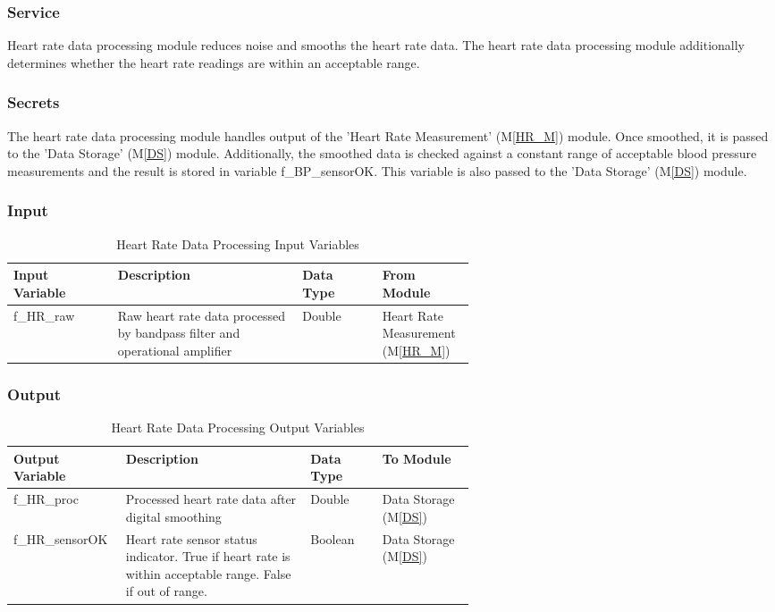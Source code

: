 \documentclass{article}
\begin{document}
\begin{description}
        \subsubsection{Service}
        Heart rate data processing module reduces noise and smooths the heart rate data.  The heart rate data processing module additionally determines whether the heart rate readings are within an acceptable range.
        
        \subsubsection{Secrets}
        The heart rate data processing module handles output of the 'Heart Rate Measurement' (M\ref{HR_M}) module.  Once smoothed, it is passed to the 'Data Storage' (M\ref{DS}) module.  Additionally, the smoothed data is checked against a constant range of acceptable blood pressure measurements and the result is stored in variable f\_BP\_sensorOK.  This variable is also passed to the 'Data Storage' (M\ref{DS}) module.
        
        \subsubsection{Input}
            \begin{longtable}{|l|p{0.4\linewidth}|l|p{0.2\linewidth}|}
            \caption{Heart Rate Data Processing Input Variables}
            \hline
            \textbf{Input Variable} & \textbf{Description} & \textbf {Data Type} & \textbf{From Module} \\
            \endhead
            \hline
            f\_HR\_raw & Raw heart rate data processed by bandpass filter and operational amplifier & Double & Heart Rate Measurement (M\ref{HR_M})\\
            \hline
            \end{longtable}
        \newpage
        \subsubsection{Output}
            \begin{longtable}{|l|p{0.4\linewidth}|l|p{0.2\linewidth}|}
            \caption{Heart Rate Data Processing Output Variables}
            \hline
            \textbf{Output Variable} & \textbf{Description} & \textbf {Data Type} & \textbf{To Module} \\
            \endhead
            \hline
            f\_HR\_proc & Processed heart rate data after digital smoothing & Double & Data Storage (M\ref{DS}) \\
            \hline
            f\_HR\_sensorOK & Heart rate sensor status indicator.  True if heart rate is within acceptable range.  False if out of range. & Boolean &  Data Storage (M\ref{DS})\\
            \hline
            \end{longtable}

\end{description}
\end{document}

